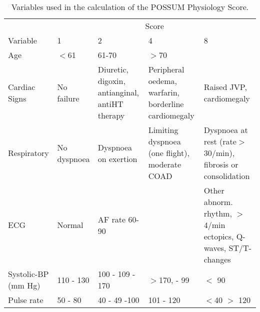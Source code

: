 \begin{table}[p]
	\caption{Variables used in the calculation of the POSSUM Physiology Score.}
	\label{table:intro_possum}
	\footnotesize
	\centering
	\renewcommand{\arraystretch}{2} %
	\begin{tabular}{| p{2.5cm} p{2cm}  p{2.7cm}  p{2.7cm}  p{2.7cm}|}
		\hline
		                             &                                                                                        \multicolumn{4}{c|}{Score}                                                                                        \\
		Variable                     & 1           & 2                                              & 4                                                    & 8                                                                                  \\ \hline
		Age                          & $<$61       & 61-70                                          & $>$70                                                &  \\
		Cardiac Signs                & No failure  & Diuretic, digoxin, antianginal, antiHT therapy & Peripheral oedema, warfarin, borderline cardiomegaly & Raised JVP, cardiomegaly                                                           \\
		Respiratory                  & No dyspnoea & Dyspnoea on exertion                           & Limiting dyspnoea (one flight), moderate COAD        & Dyspnoea at rest (rate$>$30/min), fibrosis or consolidation                        \\
		ECG                          & Normal      & AF \newline rate 60-90                         &                                                      & Other abnorm. rhythm,  \newline $>$4/min ectopics,  \newline Q-waves, ST/T-changes \\
		Systolic-BP (mm Hg)          & 110 - 130   & 100 - 109 \newline 131 - 170                   & $>$170, \newline 90 - 99                             & $<$ 90                                                                             \\
		Pulse rate                   & 50 - 80     & 40 - 49 \newline 81 -100                       & 101 - 120                                            & $<$40 \newline $>$ 120                                                             \\

\end{tabular}
\end{table}
